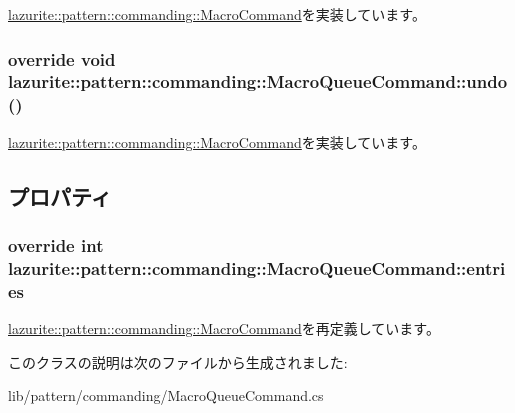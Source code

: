 \hyperlink{classlazurite_1_1pattern_1_1commanding_1_1_macro_command_afa0d8581adff629f311bd109de0657b5}{lazurite::pattern::commanding::MacroCommand}を実装しています。\hypertarget{classlazurite_1_1pattern_1_1commanding_1_1_macro_queue_command_af5e1197135ed072c1be8c9337949e12d}{
\subsubsection[{undo}]{\setlength{\rightskip}{0pt plus 5cm}override void lazurite::pattern::commanding::MacroQueueCommand::undo ()}}
\label{classlazurite_1_1pattern_1_1commanding_1_1_macro_queue_command_af5e1197135ed072c1be8c9337949e12d}


\hyperlink{classlazurite_1_1pattern_1_1commanding_1_1_macro_command_ae042e0f0207269ebb1c201ea39b860fb}{lazurite::pattern::commanding::MacroCommand}を実装しています。

\subsection{プロパティ}
\hypertarget{classlazurite_1_1pattern_1_1commanding_1_1_macro_queue_command_a9537c221d8cf19dbb5de28aafb334a70}{
\subsubsection[{entries}]{\setlength{\rightskip}{0pt plus 5cm}override int lazurite::pattern::commanding::MacroQueueCommand::entries}}
\label{classlazurite_1_1pattern_1_1commanding_1_1_macro_queue_command_a9537c221d8cf19dbb5de28aafb334a70}


\hyperlink{classlazurite_1_1pattern_1_1commanding_1_1_macro_command_ad07b059cd5dce67ac04b21290c29e625}{lazurite::pattern::commanding::MacroCommand}を再定義しています。

このクラスの説明は次のファイルから生成されました:\begin{DoxyCompactItemize}
\item 
lib/pattern/commanding/MacroQueueCommand.cs\end{DoxyCompactItemize}
